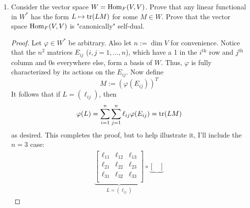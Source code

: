 \documentclass[../psets.tex]{subfiles}
\begin{document}
\begin{enumerate}
\begin{enumerate}
\begin{proof}
            Let $v\otimes\varphi$ be an arbitrary simple tensor im $V\otimes V^*$. Recall from the 10/2 lecture that
            \begin{equation*}
                v_1\otimes\alpha \mapsto [v_2\mapsto\alpha(v_2)v_1]
            \end{equation*}
            is a good isomorphism from $V\otimes V^*\cong\Hom_F(V,V)$. It follows that the linear map to which $v\otimes\varphi$ corresponds is the map $L:V\to V$ defined by $L(v')=\varphi(v')v$. Since $\im\varphi=\C$, we have that $\im(L)\leq\C v$. Thus, since $\dim(\C v)=1$, we have that $\rank(L)\leq 1$, as desired.
        \end{proof}
        \item Consider the vector space $W=\operatorname{Hom}_F(V,V)$. Prove that any linear functional in $W^*$ has the form $L\mapsto\tr(LM)$ for some $M\in W$. Prove that the vector space $\operatorname{Hom}_F(V,V)$ is "canonically" self-dual.
        \begin{proof}
            Let $\varphi\in W^*$ be arbitrary. Also let $n:=\dim V$ for convenience. Notice that the $n^2$ matrices $E_{ij}$ ($i,j=1,\dots,n$), which have a 1 in the $i^\text{th}$ row and $j^\text{th}$ column and 0s everywhere else, form a basis of $W$. Thus, $\varphi$ is fully characterized by its actions on the $E_{ij}$. Now define
            \begin{equation*}
                M := (\varphi(E_{ij}))^T
            \end{equation*}
            It follows that if $L=(\ell_{ij})$, then
            \begin{equation*}
                \varphi(L) = \sum_{i=1}^n\sum_{j=1}^n\ell_{ij}\varphi(E_{ij}) = \tr(LM)
            \end{equation*}
            as desired. This completes the proof, but to help illustrate it, I'll include the $n=3$ case:
            \begin{multline*}
                \underbrace{
                    \begin{bmatrix}
                        \ell_{11} & \ell_{12} & \ell_{13}\\
                        \ell_{21} & \ell_{22} & \ell_{23}\\
                        \ell_{31} & \ell_{32} & \ell_{33}\\
                    \end{bmatrix}
                }_{L=(\ell_{ij})}\circ\underbrace{
                    \begin{bmatrix}

\end{bmatrix}}
\end{multline*}
\end{proof}
\end{enumerate}
\end{enumerate}
\end{document}

